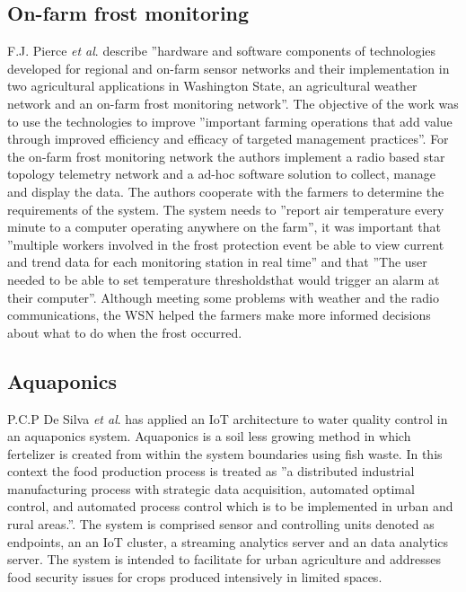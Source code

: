\documentclass[]{uiophd}
\begin{document}
\subsection{On-farm frost monitoring}
F.J. Pierce \textit{et al}. \cite{PIERCE200832} describe ''hardware and software components of technologies developed for regional and on-farm sensor networks and their implementation in two agricultural applications in Washington State, an agricultural weather network and an on-farm frost monitoring network''. The objective of the work was to use the technologies to improve ''important farming operations that add value through improved efficiency and efficacy of targeted management practices''\cite{PIERCE200832}. For the on-farm frost monitoring network the authors implement a radio based star topology telemetry network and a ad-hoc software solution to collect, manage and display the data. The authors cooperate with the farmers to determine the requirements of the system. The system needs to ''report air temperature every minute to a computer operating anywhere on the farm''\cite{PIERCE200832}, it was important that ''multiple workers involved in the frost protection event be able to view current and trend data for each monitoring station in real time''\cite{PIERCE200832} and that ''The user needed to be able to set temperature thresholdsthat would trigger an alarm at their computer''\cite{PIERCE200832}. Although meeting some problems with weather and the radio communications, the WSN helped the farmers make more informed decisions about what to do when the frost occurred. 

\subsection{Aquaponics}
P.C.P De Silva \textit{et al}. \cite{7780266} has applied an IoT architecture to water quality control in an aquaponics system. Aquaponics is a soil less growing method in which fertelizer is created from within the system boundaries using fish waste. In this context the food production process is treated as ''a distributed industrial manufacturing process with strategic data acquisition, automated optimal control, and automated process control which is to be implemented in urban and rural areas.''\cite{77802661}. The system is comprised sensor and controlling units denoted as endpoints, an an IoT cluster, a  streaming analytics server and an data analytics server. The system is intended to facilitate for urban agriculture and addresses food security issues for crops produced intensively in limited spaces.  
\end{document}
